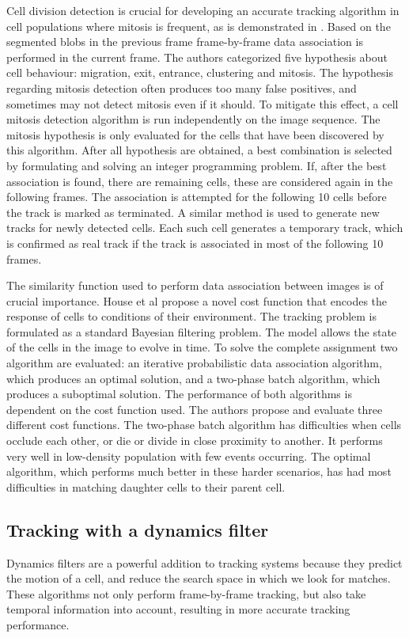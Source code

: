 Cell division detection is crucial for developing an accurate tracking algorithm in cell populations where mitosis is frequent, as is demonstrated in \cite{huh13}. Based on the segmented blobs in the previous frame frame-by-frame data association is performed in the current frame. The authors categorized five hypothesis about cell behaviour: migration, exit, entrance, clustering and mitosis. The hypothesis regarding mitosis detection often produces too many false positives, and sometimes may not detect mitosis even if it should. To mitigate this effect, a cell mitosis detection algorithm is run independently on the image sequence. The mitosis hypothesis is only evaluated for the cells that have been discovered by this algorithm. After all hypothesis are obtained, a best combination is selected by formulating and solving an integer programming problem. If, after the best association is found, there are remaining cells, these are considered again in the following frames. The association is attempted for the following 10 cells before the track is marked as terminated. A similar method is used to generate new tracks for newly detected cells. Each such cell generates a temporary track, which is confirmed as real track if the track is associated in most of the following 10 frames.

The similarity function used to perform data association between images is of crucial importance. House et al \cite{house09} propose a novel cost function that encodes the response of cells to conditions of their environment. The tracking problem is formulated as a standard Bayesian filtering problem. The model allows the state of the cells in the image to evolve in time. To solve the complete assignment two algorithm are evaluated: an iterative probabilistic data association algorithm, which produces an optimal solution, and a two-phase batch algorithm, which produces a suboptimal solution. The performance of both algorithms is dependent on the cost function used. The authors propose and evaluate three different cost functions. The two-phase batch algorithm has difficulties when cells occlude each other, or die or divide in close proximity to another. It performs very well in low-density population with few events occurring. The optimal algorithm, which performs much better in these harder scenarios, has had most difficulties in matching daughter cells to their parent cell.


\subsection{Tracking with a dynamics filter}
Dynamics filters are a powerful addition to tracking systems because they predict the motion of a cell, and reduce the search space in which we look for matches. These algorithms not only perform frame-by-frame tracking, but also take temporal information into account, resulting in more accurate tracking performance.

